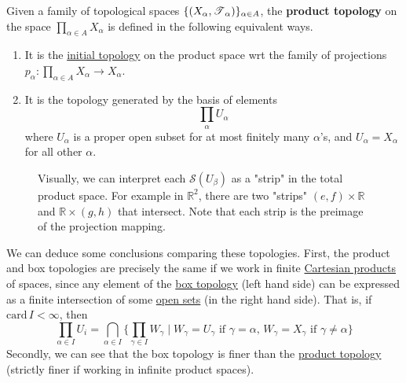   \begin{definition} 
    \label{def:product-topology}
    Given a family of topological spaces $\{(X_\alpha, \operatorname{\mathscr{T}}_\alpha)\}_{\alpha \in A}$, the \textbf{product topology} on the space $\prod_{\alpha \in A} X_\alpha$ is defined in the following equivalent ways. 
    \begin{enumerate}
      \item It is the \hyperref[def:initial-topology]{initial topology} on the product space wrt the family of projections $p_\alpha: \prod_{\alpha \in A} X_\alpha \rightarrow X_\alpha$. 

      \item It is the topology generated by the basis of elements 
      \begin{equation}
        \prod_\alpha U_\alpha 
      \end{equation}
      where $U_\alpha$ is a proper open subset for at most finitely many $\alpha$'s, and $U_\alpha = X_\alpha$ for all other $\alpha$. 
    \end{enumerate}

    \begin{figure}[H]
      \centering 
      \caption{Visually, we can interpret each $\mathscr{S} (U_\beta)$ as a "strip" in the total product space. For example in $\mathbb{R}^2$, there are two "strips" $(e, f) \times \mathbb{R}$ and $\mathbb{R} \times (g, h)$ that intersect. Note that each strip is the preimage of the projection mapping. }
      \label{fig:product_topology}
    \end{figure}
  \end{definition}

  We can deduce some conclusions comparing these topologies. First, the product and box topologies are precisely the same if we work in finite \hyperref[st-def:cart-prod-2]{Cartesian products} of spaces, since any element of the \hyperref[def:box-topology]{box topology} (left hand side) can be expressed as a finite intersection of some \hyperref[def:open-set]{open sets} (in the right hand side). That is, if $\text{card}\,I < \infty$, then 
  \begin{equation}
    \prod_{\alpha \in I} U_i = \bigcap_{\alpha \in I} \big\{ \prod_{\gamma \in I} W_\gamma \mid W_\gamma = U_\gamma \text{ if } \gamma = \alpha, \, W_\gamma = X_\gamma \text{ if } \gamma \neq \alpha\big\}
  \end{equation}
  Secondly, we can see that the box topology is finer than the \hyperref[def:product-topology]{product topology} (strictly finer if working in infinite product spaces). 

